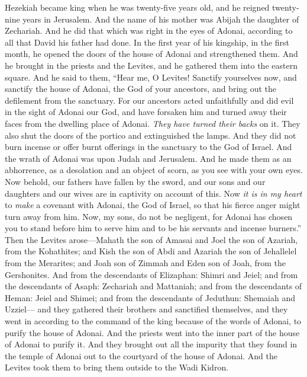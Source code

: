 \begin{biblechapter} %
 Hezekiah became king when he was twenty-five years old, and he reigned twenty-nine years in Jerusalem. And the name of his mother was Abijah the daughter of Zechariah.
\verse And he did that which was right in the eyes of Adonai, according to all that David his father had done.
\verse In the first year of his kingship, in the first month, he opened the doors of the house of Adonai and strengthened them.
\verse And he brought in the priests and the Levites, and he gathered them into the eastern square.
\verse And he said to them, “Hear me, O Levites! Sanctify yourselves now, and sanctify the house of Adonai, the God of your ancestors, and bring out the defilement from the sanctuary.
\verse For our ancestors acted unfaithfully and did evil in the sight of Adonai our God, and have forsaken him and turned away their faces from the dwelling place of Adonai. \textit{They have turned their backs} on it.
\verse They also shut the doors of the portico and extinguished the lamps. And they did not burn incense or offer burnt offerings in the sanctuary to the God of Israel.
\verse And the wrath of Adonai was upon Judah and Jerusalem. And he made them as an abhorrence, as a desolation and an object of scorn, as you see with your own eyes.
\verse Now behold, our fathers have fallen by the sword, and our sons and our daughters and our wives are in captivity on account of this.
\verse Now \textit{it is in my heart} to \textit{make} a covenant with Adonai, the God of Israel, so that his fierce anger might turn away from him.
\verse Now, my sons, do not be negligent, for Adonai has chosen you to stand before him to serve him and to be his servants and incense burners.”
\verse Then the Levites arose—Mahath the son of Amasai and Joel the son of Azariah, from the Kohathites; and Kish the son of Abdi and Azariah the son of Jehallelel from the Merarites; and Joah son of Zimmah and Eden son of Joah, from the Gershonites.
\verse And from the descendants of Elizaphan: Shimri and Jeiel; and from the descendants of Asaph: Zechariah and Mattaniah;
\verse and from the descendants of Heman: Jeiel and Shimei; and from the descendants of Jeduthun: Shemaiah and Uzziel—
\verse and they gathered their brothers and sanctified themselves, and they went in according to the command of the king because of the words of Adonai, to purify the house of Adonai.
\verse And the priests went into the inner part of the house of Adonai to purify it. And they brought out all the impurity that they found in the temple of Adonai out to the courtyard of the house of Adonai. And the Levites took them to bring them outside to the Wadi Kidron.

\end{biblechapter}
